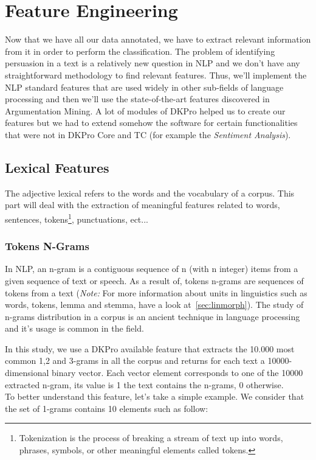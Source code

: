 \section{Feature Engineering}
Now that we have all our data annotated, we have to extract relevant information from it in order to perform the classification. The problem of identifying persuasion in a text is a relatively new question in NLP and we don't have any straightforward methodology to find relevant features. Thus, we'll implement the NLP standard features that are used widely in other sub-fields of language processing and then we'll use the state-of-the-art features discovered in Argumentation Mining. A lot of modules of DKPro helped us to create our features but we had to extend somehow the software for certain functionalities that were not in DKPro Core and TC (for example the \emph{Sentiment Analysis}).

\subsection{Lexical Features}   
The adjective lexical refers to the words and the vocabulary of a corpus. This part will deal with the extraction of meaningful features related to words, sentences, \glspl{token}\footnote{Tokenization is the process of breaking a stream of text up into words, phrases, symbols, or other meaningful elements called tokens.}, punctuations, ect...

\subsubsection{Tokens N-Grams}
In NLP, an n-gram is a contiguous sequence of n (with n integer) items from a given sequence of text or speech. As a result of, tokens n-grams are sequences of tokens from a text (\textit{Note: } For more information about units in linguistics such as words, tokens, \gls{lemma} and \gls{stemma}, have a look at~\cref{sec:linmorph}). The study of n-grams distribution in a corpus is an ancient technique \cite{tcjullmann77} in language processing and it's usage is common in the field.

In this study, we use a DKPro available feature that extracts the 10.000 most common 1,2 and 3-grams in all the corpus and returns for each text a 10000-dimensional binary vector. Each vector element corresponds to one of the 10000 extracted n-gram, its value is 1 the text contains the n-grams, 0 otherwise.
\\
To better understand this feature, let's take a simple example. We consider that the set of 1-grams contains 10 elements such as follow: 

